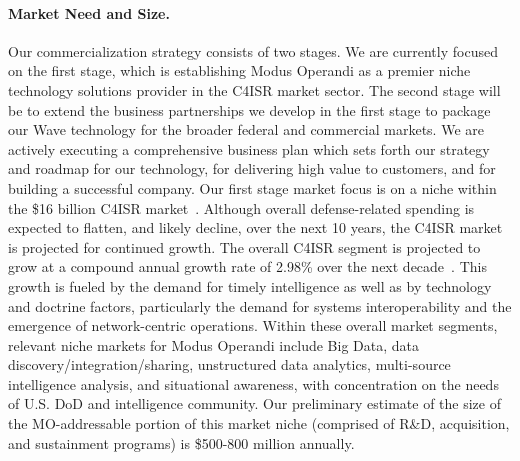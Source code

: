 \documentclass{sbir}
\begin{document}
\paragraph{Market Need and Size.} Our commercialization strategy consists of two stages. We are currently focused on the first stage, which is establishing Modus Operandi as a premier niche technology solutions provider in the C4ISR market sector. The second stage will be to extend the business partnerships we develop in the first stage to package our Wave technology for the broader federal and commercial markets.
We are actively executing a comprehensive business plan which sets forth our strategy and roadmap for our technology, for delivering high value to customers, and for building a successful company. Our first stage market focus is on a niche within the \$16 billion C4ISR market~\cite{iCD:12}. Although overall defense-related spending is expected to flatten, and likely decline, over the next 10 years, the C4ISR market is projected for continued growth. The overall C4ISR segment is projected to grow at a compound annual growth rate of 2.98\% over the next decade~\cite{iCD:12}. This growth is fueled by the demand for timely intelligence as well as by technology and doctrine factors, particularly the demand for systems interoperability and the emergence of network-centric operations.
Within these overall market segments, relevant niche markets for Modus Operandi include Big Data, data discovery/integration/sharing, unstructured data analytics, multi-source intelligence analysis, and situational awareness, with concentration on the needs of U.S. DoD and intelligence community. Our preliminary estimate of the size of the MO-addressable portion of this market niche (comprised of R\&D, acquisition, and sustainment programs) is \$500-800 million annually.
\end{document}
